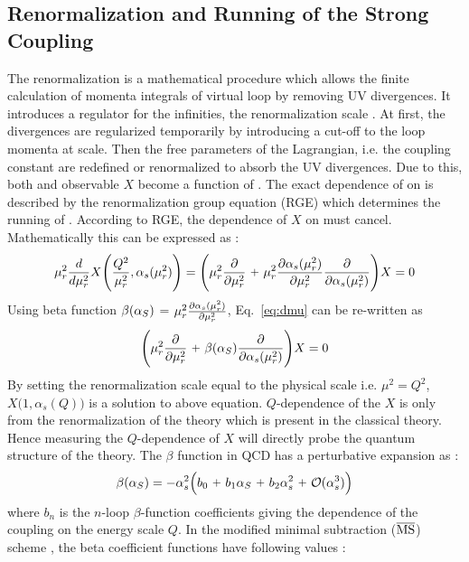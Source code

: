 \subsection{Renormalization and Running of the Strong Coupling}
The renormalization is a mathematical procedure which allows the finite calculation of momenta integrals of virtual loop by removing UV divergences. It introduces a regulator for the infinities, the renormalization scale \mur. At first, the divergences are regularized temporarily by introducing a cut-off to the loop momenta at \mur scale. Then the free parameters of the Lagrangian, i.e. the coupling constant are redefined or renormalized to absorb the UV divergences. Due to this, both \alpsq and observable $X$ become a function of \mur. The exact dependence of \alpsmusq on \mur is described by the renormalization group equation (RGE) \cite{Callan:1970yg} which determines the running of \alpsmusq. According to RGE, the dependence of $X$ on \mur must cancel. Mathematically this can be expressed as : 
\begin{equation}
\mur^{2}\frac{d}{d\mur^{2}}X\Bigg(\frac{Q^{2}}{\mur^{2}},\alpha_{s}(\mur^{2})\Bigg)=
\Bigg(\mur^{2}\frac{\partial}{\partial\mur^{2}}~\plus \mur^{2}\frac{\partial\alpha_{s}(\mur^{2})}
{\partial\mur^{2}}\frac{\partial}{\partial\alpha_{s}(\mur^{2})}\Bigg)X=0
\label{eq:dmu}
\end{equation}
Using beta function $\beta(\alpha_S)$ = $\mur^{2}\frac{\partial\alpha_{s}(\mur^{2})}{\partial\mur^{2}}$, Eq.~\ref{eq:dmu} can be re-written as 
\begin{equation}
\Bigg(\mur^{2}\frac{\partial}{\partial\mur^{2}}~\plus \beta(\alps)\frac{\partial}{\partial\alpha_{s}(\mur^{2})}\Bigg)X=0
\label{eq:dmu2}
\end{equation}
By setting the renormalization scale equal to the physical scale i.e. $\mu^{2}=Q^{2}$, $X\big(1,\alpha_{s}(Q)\big)$ is a solution to above equation. $Q$-dependence of the $X$ is only from the renormalization of the theory which is present in the classical theory. Hence measuring the $Q$-dependence of $X$ will directly probe the quantum structure of the theory. The $\beta$ function in QCD has a perturbative expansion as : 
\begin{equation}
\beta(\alps)=-\alpha_{s}^{2}\Big(b_0~\plus b_1\alps~\plus b_2\alpha_{s}^{2}~\plus {\cal O}(\alpha_{s}^{3})\Big) 
\label{eq:beta}
\end{equation}
where $b_n$ is the $n$-loop $\beta$-function coefficients giving the dependence of the coupling on the energy scale $Q$. In the modified minimal subtraction ($\overline{\rm MS}$) scheme \cite{tHooft:1973mfk,Weinberg:1951ss}, the beta coefficient functions have following values :

